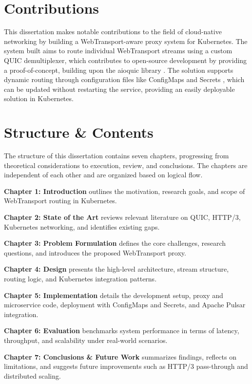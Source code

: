\section{Contributions}

This dissertation makes notable contributions to the field of cloud-native networking by building a WebTransport-aware proxy system for Kubernetes. The system built aims to route individual WebTransport streams using a custom QUIC demultiplexer, which contributes to open-source development by providing a proof-of-concept, building upon the aioquic library \cite{aioquic-repo}. The solution supports dynamic routing through configuration files like ConfigMaps and Secrets \cite{kubernetes-docs}, which can be updated without restarting the service, providing an easily deployable solution in Kubernetes.


\section{Structure \& Contents}

The structure of this dissertation contains seven chapters, progressing from theoretical considerations to execution, review, and conclusions. The chapters are independent of each other and are organized based on logical flow.

\textbf{Chapter 1: Introduction} outlines the motivation, research goals, and scope of WebTransport routing in Kubernetes.

\textbf{Chapter 2: State of the Art} reviews relevant literature on QUIC, HTTP/3, Kubernetes networking, and identifies existing gaps.

\textbf{Chapter 3: Problem Formulation} defines the core challenges, research questions, and introduces the proposed WebTransport proxy.

\textbf{Chapter 4: Design} presents the high-level architecture, stream structure, routing logic, and Kubernetes integration patterns.

\textbf{Chapter 5: Implementation} details the development setup, proxy and microservice code, deployment with ConfigMaps and Secrets, and Apache Pulsar integration.

\textbf{Chapter 6: Evaluation} benchmarks system performance in terms of latency, throughput, and scalability under real-world scenarios.

\textbf{Chapter 7: Conclusions \& Future Work} summarizes findings, reflects on limitations, and suggests future improvements such as HTTP/3 pass-through and distributed scaling.
